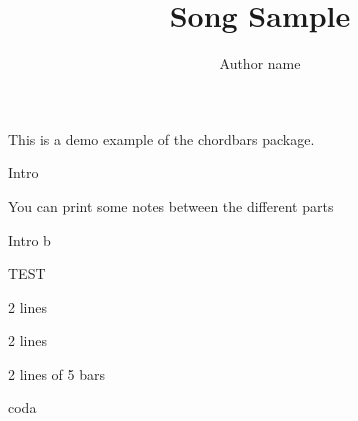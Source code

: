 \documentclass[11pt]{article}
\title{Song Sample}
\author{Author name}
\begin{document}
\bpbthree

\countbarsYes

\songtitle

This is a demo example of the chordbars package.


\begin{chordbar}{4}{Intro}
\repeatBarPair
\end{chordbar}

You can print some notes between the different parts

\begin{chordbar}[3]{6}{Intro b}
\repeatBar
{}
\end{chordbar}


\begin{chordbar}[2]{4}{TEST}
\repeatBar
\end{chordbar}



\begin{chordbar}[2]{6}{2 lines}
\repeatBar
{}
\repeatBar
\end{chordbar}

\begin{chordbar}[4]{11}{2 lines}
\newchordline
{}
\repeatBar
\end{chordbar}

\begin{chordbar}[2]{10}{2 lines of 5 bars}
\newchordline
{}
\repeatBar
\end{chordbar}


\begin{chordbar}[2]{11}{coda}
\end{chordbar}


\printNbBars
\end{document}

